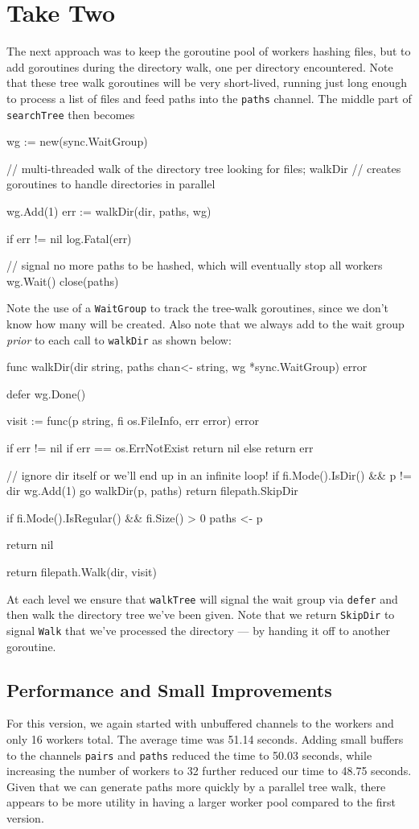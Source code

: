\documentclass[12pt,notitlepage]{article}
\begin{document}
\section{Take Two}
The next approach was to keep the goroutine pool of workers hashing files, but to
add goroutines during the directory walk, one per directory encountered. Note that
these tree walk goroutines will be very short-lived, running just long enough to
process a list of files and feed paths into the \verb|paths| channel. The middle
part of \verb|searchTree| then becomes
\begin{golang}
    wg := new(sync.WaitGroup)

	// multi-threaded walk of the directory tree looking for files; walkDir
	// creates goroutines to handle directories in parallel

	wg.Add(1)
	err := walkDir(dir, paths, wg)

	if err != nil {
		log.Fatal(err)
	}

	// signal no more paths to be hashed, which will eventually stop all workers
	wg.Wait()
	close(paths)
\end{golang}
Note the use of a \verb|WaitGroup| to track the tree-walk goroutines, since we
don't know how many will be created. Also note that we always add to the wait
group {\em prior} to each call to \verb|walkDir| as shown below:
\begin{golang}
func walkDir(dir string, paths chan<- string, wg *sync.WaitGroup) error {
	defer wg.Done()

	visit := func(p string, fi os.FileInfo, err error) error {
		if err != nil {
			if err == os.ErrNotExist {
				return nil
			} else {
				return err
			}
		}

        // ignore dir itself or we'll end up in an infinite loop!
		if fi.Mode().IsDir() && p != dir {
			wg.Add(1)
			go walkDir(p, paths)
			return filepath.SkipDir
		}

		if fi.Mode().IsRegular() && fi.Size() > 0 {
			paths <- p
		}

		return nil
	}

	return filepath.Walk(dir, visit)
}
\end{golang}
At each level we ensure that \verb|walkTree| will signal the wait group via
\verb|defer| and then walk the directory tree we've been given. Note that we return
\verb|SkipDir| to signal \verb|Walk| that we've processed the directory --- by
handing it off to another goroutine.

\subsection{Performance and Small Improvements}
For this version, we again started with unbuffered channels to the workers and
only 16 workers total. The average time was 51.14 seconds. Adding small buffers
to the channels \verb|pairs| and \verb|paths| reduced the time to 50.03 seconds,
while increasing the number of workers to 32 further reduced our time to 48.75
seconds. Given that we can generate paths more quickly by a parallel tree walk,
there appears to be more utility in having a larger worker pool compared to the
first version.
\end{document}
